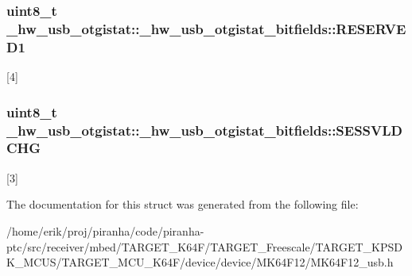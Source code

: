 \subsubsection[{\texorpdfstring{R\+E\+S\+E\+R\+V\+E\+D1}{RESERVED1}}]{\setlength{\rightskip}{0pt plus 5cm}uint8\+\_\+t \+\_\+hw\+\_\+usb\+\_\+otgistat\+::\+\_\+hw\+\_\+usb\+\_\+otgistat\+\_\+bitfields\+::\+R\+E\+S\+E\+R\+V\+E\+D1}\hypertarget{struct__hw__usb__otgistat_1_1__hw__usb__otgistat__bitfields_a5ea328f79cbfb5dd75ac277876d3eaf2}{}\label{struct__hw__usb__otgistat_1_1__hw__usb__otgistat__bitfields_a5ea328f79cbfb5dd75ac277876d3eaf2}
\mbox{[}4\mbox{]} 
\subsubsection[{\texorpdfstring{S\+E\+S\+S\+V\+L\+D\+C\+HG}{SESSVLDCHG}}]{\setlength{\rightskip}{0pt plus 5cm}uint8\+\_\+t \+\_\+hw\+\_\+usb\+\_\+otgistat\+::\+\_\+hw\+\_\+usb\+\_\+otgistat\+\_\+bitfields\+::\+S\+E\+S\+S\+V\+L\+D\+C\+HG}\hypertarget{struct__hw__usb__otgistat_1_1__hw__usb__otgistat__bitfields_af7bb4d1edc879843caf97420214ece23}{}\label{struct__hw__usb__otgistat_1_1__hw__usb__otgistat__bitfields_af7bb4d1edc879843caf97420214ece23}
\mbox{[}3\mbox{]} 

The documentation for this struct was generated from the following file\+:\begin{DoxyCompactItemize}
\item 
/home/erik/proj/piranha/code/piranha-\/ptc/src/receiver/mbed/\+T\+A\+R\+G\+E\+T\+\_\+\+K64\+F/\+T\+A\+R\+G\+E\+T\+\_\+\+Freescale/\+T\+A\+R\+G\+E\+T\+\_\+\+K\+P\+S\+D\+K\+\_\+\+M\+C\+U\+S/\+T\+A\+R\+G\+E\+T\+\_\+\+M\+C\+U\+\_\+\+K64\+F/device/device/\+M\+K64\+F12/M\+K64\+F12\+\_\+usb.\+h\end{DoxyCompactItemize}
